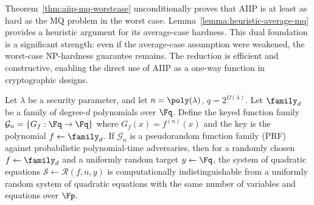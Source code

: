             \begin{remark}\label{rm:reduction-interpretation}
                Theorem~\ref{thm:aiip-mq-worstcase} unconditionally proves that AIIP is at least as hard as the MQ problem in the worst case. Lemma~\ref{lemma:heuristic-average-mq} provides a heuristic argument for its average-case hardness. This dual foundation is a significant strength: even if the average-case assumption were weakened, the worst-case NP-hardness guarantee remains. The reduction is efficient and constructive, enabling the direct use of AIIP as a one-way function in cryptographic designs.
            \end{remark}
            \begin{lemma}\label{lemma:indist}
                Let $\lambda$ be a security parameter, and let $n = \poly(\lambda)$, $q = 2^{\Omega(\lambda)}$. Let $\family_d$ be a family of degree-$d$ polynomials over $\Fq$. Define the keyed function family $\mathcal{G}_n = \{ G_f: \Fq \to \Fq \}$ where $G_f(x) = f^{(n)}(x)$ and the key is the polynomial $f \leftarrow \family_d$.
                If $\mathcal{G}_n$ is a pseudorandom function family (PRF) against probabilistic polynomial-time adversaries, then for a randomly chosen $f \leftarrow \family_d$ and a uniformly random target $y \leftarrow \Fq$, the system of quadratic equations $\mathcal{S} \gets \mathcal{R}(f, n, y)$ is computationally indistinguishable from a uniformly random system of quadratic equations with the same number of variables and equations over $\Fp$.
            \end{lemma}
